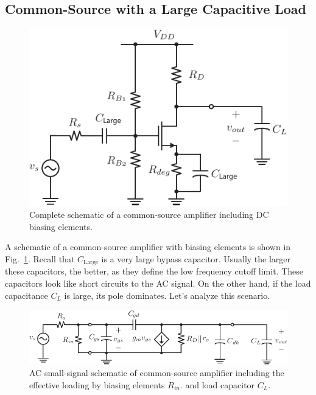\section{\topicC}
\subsection{Common-Source with a Large Capacitive Load}
\begin{figure}[tb]
\begin{center}
\includegraphics[scale=1]{6cs_dc}
\end{center}
\caption{Complete schematic of a common-source amplifier including DC biasing elements.} \label{fig:6cs_dc}
\end{figure}

A schematic of a common-source amplifier with biasing elements is shown in Fig.~\ref{fig:6cs_dc}. Recall that $C_{\text{Large}}$ is a very large bypass capacitor.  Usually the larger these capacitors, the better, as they define the low frequency cutoff limit.  These capacitors look like short circuits to the AC signal.  On the other hand, if the load capacitance $C_L$ is large, its pole dominates. Let's analyze this scenario.
\begin{figure}[tb]
\begin{center}
\includegraphics[scale=1]{7cs_cL_ss}
\end{center}
\caption{AC small-signal schematic of common-source amplifier including the effective loading by biasing elements $R_{in}$. and load capacitor $C_L$.}
\label{fig:7cs_cL_ss}
\end{figure}

